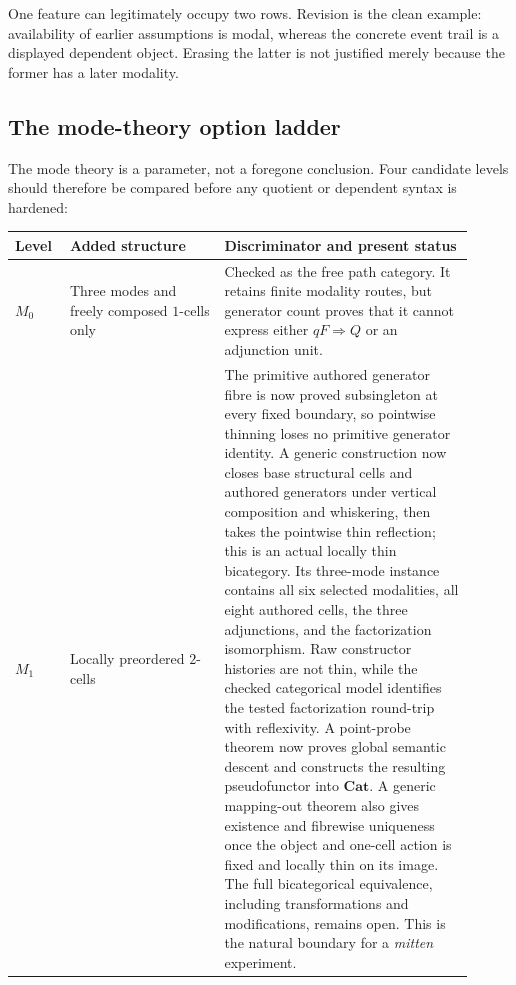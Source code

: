 \documentclass[11pt]{article}
\theoremstyle{definition}
\theoremstyle{remark}
\begin{document}
One feature can legitimately occupy two rows.  Revision is the clean example:
availability of earlier assumptions is modal, whereas the concrete event trail
is a displayed dependent object.  Erasing the latter is not justified merely
because the former has a later modality.

\subsection{The mode-theory option ladder}

The mode theory is a parameter, not a foregone conclusion.  Four candidate
levels should therefore be compared before any quotient or dependent syntax is
hardened:

\begin{longtable}{>{\raggedright\arraybackslash}p{0.10\linewidth}%
                  >{\raggedright\arraybackslash}p{0.31\linewidth}%
                  >{\raggedright\arraybackslash}p{0.50\linewidth}}
\toprule
Level & Added structure & Discriminator and present status \\
\midrule
\endhead
$M_0$ & Three modes and freely composed $1$-cells only & Checked as the free
  path category.  It retains finite modality routes, but generator count proves
  that it cannot express either $qF\Rightarrow Q$ or an adjunction unit. \\
$M_1$ & Locally preordered $2$-cells & The primitive authored generator fibre is
  now proved subsingleton at every fixed boundary, so pointwise thinning loses
  no primitive generator identity.  A generic construction now closes base
  structural cells and authored generators under vertical composition and
  whiskering, then takes the pointwise thin reflection; this is an actual
  locally thin bicategory.  Its three-mode instance contains all six selected
  modalities, all eight authored cells, the three adjunctions, and the
  factorization isomorphism.  Raw constructor histories are not thin, while
  the checked categorical model identifies the tested factorization round-trip
  with reflexivity.  A point-probe theorem now proves global semantic descent
  and constructs the resulting pseudofunctor into $\mathbf{Cat}$.  A generic
  mapping-out theorem also gives existence and fibrewise uniqueness once the
  object and one-cell action is fixed and locally thin on its image.  The full
  bicategorical equivalence, including transformations and modifications,
  remains open.  This is the natural boundary for a \emph{mitten} experiment. \\

\end{longtable}
\end{document}

